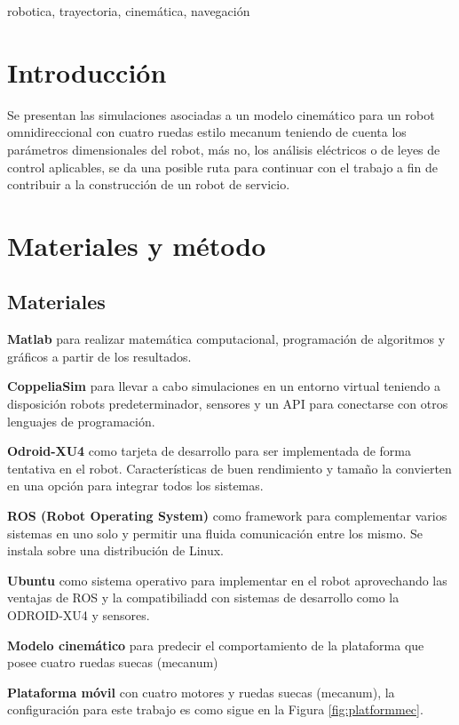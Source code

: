 \documentclass[conference]{IEEEtran}
\begin{document}
\begin{IEEEkeywords}
  robotica, trayectoria, cinemática, navegación
\end{IEEEkeywords}

\section{Introducción}
  Se presentan las simulaciones asociadas a un modelo cinemático para un robot omnidireccional 
  con cuatro ruedas estilo mecanum teniendo de cuenta los parámetros dimensionales del robot,
  más no, los análisis eléctricos o de leyes de control aplicables, se da una posible ruta
  para continuar con el trabajo a fin de contribuir a la construcción de un robot de
  servicio.
\section{Materiales y método}
\subsection{Materiales}
\textbf{Matlab} para realizar matemática computacional, programación de algoritmos y
gráficos a partir de los resultados.

\textbf{CoppeliaSim} para llevar a cabo simulaciones en un entorno virtual teniendo a
disposición robots predeterminador, sensores y un API para conectarse con otros
lenguajes de programación.

\textbf{Odroid-XU4} como tarjeta de desarrollo para ser implementada de forma
tentativa en el robot. Características de buen rendimiento y tamaño la convierten
en una opción para integrar todos los sistemas.

\textbf{ROS (Robot Operating System)} como framework para complementar varios
sistemas en uno solo y permitir una fluida comunicación entre los mismo. Se instala
sobre una distribución de Linux.

\textbf{Ubuntu} como sistema operativo para implementar en el robot aprovechando
las ventajas de ROS y la compatibiliadd con sistemas de desarrollo como la
ODROID-XU4 y sensores.

\textbf{Modelo cinemático} \cite{noauthor_gazebo_nodate} para predecir el comportamiento de la plataforma que
posee cuatro ruedas suecas (mecanum)

\textbf{Plataforma móvil} con cuatro motores y ruedas suecas (mecanum), la configuración
para este trabajo es como sigue en la Figura \ref{fig:platformmec}.
\end{document}
